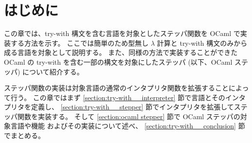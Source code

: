 \section{はじめに}
\label{section:try-with__intro}

この章では、try-with 構文を含む言語を対象としたステッパ関数を
OCaml で実装する方法を示す。
ここでは簡単のため型無し $\lambda$ 計算と try-with 構文のみから成る言語を対象として説明する。
また、同様の方法で実装することができた OCaml の try-with
を含む一部の構文を対象にしたステッパ (以下、OCaml ステッパ) について紹介する。

ステッパ関数の実装は対象言語の通常のインタプリタ関数を拡張することによって行う。
この章ではまず \ref{section:try-with__interpreter} 節で言語とそのインタプリタを定義し、
\ref{section:try-with__stepper} 節でインタプリタを拡張してステッパ関数を実装する。
そして \ref{section:ocaml stepper} 節で OCaml ステッパの対象言語や機能
およびその実装について述べ、 \ref{section:try-with__conclusion} 節でまとめる。
